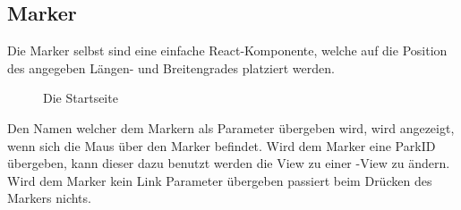 \subsection{Marker}

Die Marker selbst sind eine einfache React-Komponente, welche auf die Position des angegeben Längen- und
Breitengrades platziert werden. 

\begin{figure}[H]
    \begin{center}
      \caption{Die Startseite}
    \end{center}
\end{figure}

Den Namen welcher dem Markern als Parameter übergeben wird, wird angezeigt, wenn sich die Maus über den 
Marker befindet. Wird dem Marker eine ParkID übergeben, kann dieser dazu benutzt werden die 
View zu einer -View zu ändern. Wird dem Marker kein Link Parameter übergeben
passiert beim Drücken des Markers nichts.